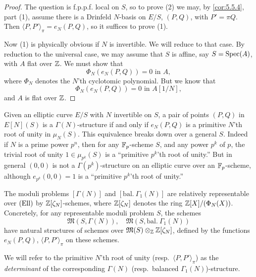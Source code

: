 \begin{proof}
The question is f.p.p.f. local on $S$, so to prove (2) we may, by \ref{cor:5.5.4}, part (1), assume there is a Drinfeld $N$-basis on $E/S$, $(P, Q)$, with $P' = \pi Q$. Then $\langle P, P'\rangle_\pi = e_N(P, Q)$, so it suffices to prove (1).

Now (1) is physically obvious if $N$ is invertible. We will reduce to that case. By reduction to the universal case, we may assume that $S$ is affine, say $S = \operatorname{Spec}(A)$, with $A$ flat over $\mathbb{Z}$. We must show that
\[
\Phi_N(e_N(P, Q)) = 0 \text{ in } A,
\]
where $\Phi_N$ denotes the $N$'th cyclotomic polynomial. But we know that
\[
\Phi_N(e_N(P, Q)) = 0 \text{ in } A[1/N],
\]
and $A$ is flat over $\mathbb{Z}$.
\end{proof}

\begin{krem}\label{rem:5.6.4}
Given an elliptic curve $E/S$ with $N$ invertible on $S$, a pair of points $(P, Q)$ in $E[N](S)$ is a $\Gamma(N)$-structure if and only if $e_N(P, Q)$ is a primitive $N$'th root of unity in $\mu_N(S)$. This equivalence breaks down over a general $S$. Indeed if $N$ is a prime power $p^n$, then for any $\mathbb{F}_p$-scheme $S$, and any power $p^k$ of $p$, the trivial root of unity $1 \in \mu_{p^k}(S)$ is a ``primitive $p^k$'th root of unity.'' But in general $(0,0)$ is not a $\Gamma(p^k)$-structure on an elliptic curve over an $\mathbb{F}_p$-scheme, although $e_{p^k}(0,0) = 1$ is a ``primitive $p^k$'th root of unity.''
\end{krem}

\begin{kcor}\label{cor:5.6.5}
The moduli problems $[\Gamma(N)]$ and $[\mathrm{bal.}\ \Gamma_1(N)]$ are relatively representable over $(\mathrm{Ell})$ by $\mathbb{Z}[\zeta_N]$-schemes, where $\mathbb{Z}[\zeta_N]$ denotes the ring $\mathbb{Z}[X]/(\Phi_N(X))$. Concretely, for any representable moduli problem $S$, the schemes
\[
\mathfrak{M}(S, \Gamma(N)),\quad \mathfrak{M}(S, \mathrm{bal.}\ \Gamma_1(N))
\]
have natural structures of schemes over $\mathfrak{M}(S)\otimes_{\mathbb{Z}} \mathbb{Z}[\zeta_N]$, defined by the functions $e_N(P, Q)$, $\langle P, P'\rangle_\pi$ on these schemes.
\end{kcor}

\begin{kterm}\label{term:5.6.6}
We will refer to the primitive $N$'th root of unity (resp.\ $\langle P, P'\rangle_\pi$) as the \emph{determinant} of the corresponding $\Gamma(N)$ (resp.\ balanced $\Gamma_1(N)$)-structure.
\end{kterm}
